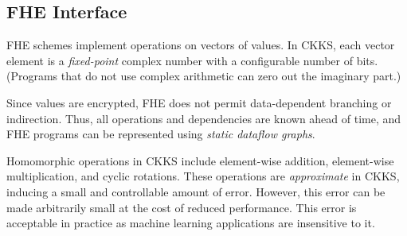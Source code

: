 \subsection{FHE Interface}

FHE schemes implement operations on vectors of values.
In CKKS, each vector element is a \emph{fixed-point} complex number with a configurable number of bits.
(Programs that do not use complex arithmetic can zero out the imaginary part.)

Since values are encrypted, FHE does not permit data-dependent branching or indirection.
Thus, all operations and dependencies are known ahead of time, and FHE programs can
be represented using \emph{static dataflow graphs}.

Homomorphic operations in CKKS include element-wise addition, element-wise multiplication,
and cyclic rotations.
These operations are \emph{approximate} in CKKS, inducing a small and
controllable amount of error. However, this error can be made arbitrarily small at the
cost of reduced performance. %
This error is acceptable in practice as machine learning applications
are insensitive to it.

